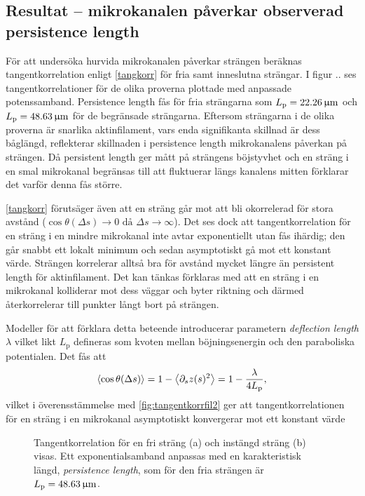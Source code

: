 \subsection{Resultat -- mikrokanalen påverkar observerad persistence length}

För att undersöka hurvida mikrokanalen påverkar strängen beräknas tangentkorrelation enligt \eqref{tangkorr} för fria samt inneslutna strängar. I figur .. ses tangentkorrelationer för de olika proverna plottade med anpassade potenssamband. Persistence length fås för fria strängarna som $L_\text{p} = \unit[22.26]{\micro m}$ och $L_\text{p} = \unit[48.63]{\micro m}$ för de begränsade strängarna. Eftersom strängarna i de olika proverna är snarlika aktinfilament, vars enda signifikanta skillnad är dess båglängd, reflekterar skillnaden i persistence length mikrokanalens påverkan på strängen. Då persistent length ger mått på strängens böjstyvhet och en sträng i en smal mikrokanal begränsas till att fluktuerar längs kanalens mitten förklarar det varför denna fås större.

\eqref{tangkorr} förutsäger även att en sträng går mot att bli okorrelerad för stora avstånd ($\cos\theta(\Delta s) \to 0 \text{ då } \Delta s \to \infty$). Det ses dock att tangentkorrelation för en sträng i en mindre mikrokanal inte avtar exponentiellt utan fås ihärdig; den går snabbt ett lokalt minimum och sedan asymptotiskt gå mot ett konstant värde. Strängen korrelerar alltså bra för avstånd mycket längre än persistent length för aktinfilament. Det kan tänkas förklaras med att en sträng i en mikrokanal kolliderar mot dess väggar och byter riktning och därmed återkorrelerar till punkter långt bort på strängen. 

Modeller för att förklara detta beteende introducerar parametern \emph{deflection length} $\lambda$ vilket likt $L_\text{p}$ defineras som kvoten mellan böjningsenergin och den paraboliska potentialen. Det fås att \cite{Koster_etal2007}
\begin{equation}
\ev{\cos\theta(\Delta s)}=1-\ev{\partial_{s}z(s)^2}=1-\frac{\lambda}{4L_\text{p}},
\end{equation}
vilket i överensstämmelse med \ref{fig:tangentkorrfil2} ger att tangentkorrelationen för en sträng i en mikrokanal asymptotiskt konvergerar mot ett konstant värde


\begin{figure}
    \centering
    
    \caption{Tangentkorrelation för en fri sträng (a) och instängd sträng (b) visas. Ett exponentialsamband anpassas med en karakteristisk längd, \emph{persistence length}, som för den fria strängen är $L_\text{p} = \unit[48.63]{\micro m}$.}
    \label{fig:tangentkorr}
\end{figure}

